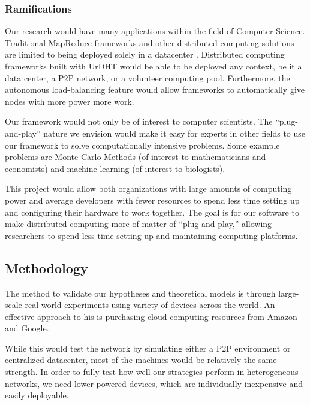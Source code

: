 \documentclass[12pt,a4paper]{article}
\begin{document}
\subsubsection*{Ramifications}
Our research would have many applications within the field of Computer Science.
Traditional MapReduce frameworks and other distributed computing solutions are limited to being deployed solely in a datacenter \cite{hadoopAssumptions}.
Distributed computing frameworks built with UrDHT would be able to be deployed any context, be it a data center, a P2P network, or a volunteer computing pool.
Furthermore, the autonomous load-balancing feature would allow frameworks to automatically give nodes with more power more work.

Our framework would not only be of interest to computer scientists.
The ``plug-and-play'' nature we envision would make it easy for experts in other fields to use our framework to solve computationally intensive problems.
Some example problems are Monte-Carlo Methods (of interest to mathematicians and economists) and machine learning (of interest to biologists).

This project would allow both organizations with large amounts of computing power and average developers with  fewer resources to spend less time setting up and configuring their hardware to work together.  
The goal is for our software to make distributed computing more of matter of ``plug-and-play,'' allowing researchers to spend less time setting up and maintaining  computing platforms.

\subsection*{Methodology}

The method to validate our hypotheses and theoretical models is through large-scale real world experiments using variety of devices across the world.
An effective approach to his is purchasing cloud computing resources from Amazon and Google.


While this would test the network by simulating either a P2P environment or centralized datacenter, most of the machines would be relatively the same strength.
In order to fully test how well our strategies perform in heterogeneous networks, we need lower powered devices, which are individually inexpensive and easily deployable.
\end{document}
